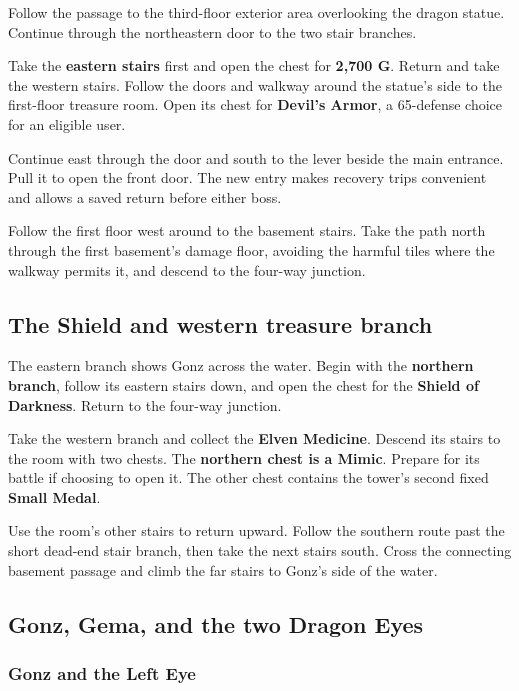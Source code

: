 Follow the passage to the third-floor exterior area overlooking
the dragon statue. Continue through the northeastern door to
the two stair branches.

Take the \textbf{eastern stairs} first and open the chest
for \textbf{2,700 G}. Return and take the western stairs.
Follow the doors and walkway around the statue's side to the
first-floor treasure room. Open its chest for
\textbf{Devil's Armor}, a 65-defense choice for an eligible user.

Continue east through the door and south to the lever beside
the main entrance. Pull it to open the front door. The new
entry makes recovery trips convenient and allows a saved
return before either boss.

Follow the first floor west around to the basement stairs.
Take the path north through the first basement's damage floor,
avoiding the harmful tiles where the walkway permits it,
and descend to the four-way junction.

\subsection*{The Shield and western treasure branch}

The eastern branch shows Gonz across the water. Begin with
the \textbf{northern branch}, follow its eastern stairs down,
and open the chest for the \textbf{Shield of Darkness}.
Return to the four-way junction.

Take the western branch and collect the \textbf{Elven Medicine}.
Descend its stairs to the room with two chests. The
\textbf{northern chest is a Mimic}. Prepare for its battle
if choosing to open it. The other chest contains the tower's
second fixed \textbf{Small Medal}.

Use the room's other stairs to return upward. Follow the
southern route past the short dead-end stair branch, then
take the next stairs south. Cross the connecting basement
passage and climb the far stairs to Gonz's side of the water.

\subsection{Gonz, Gema, and the two Dragon Eyes}

\subsubsection*{Gonz and the Left Eye}

